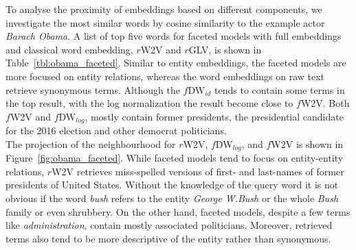 To analyse the proximity of embeddings based on different components, we investigate the most similar words by cosine similarity to the example actor \emph{Barach Obama}. A list of top five words for faceted models with full embeddings and classical word embedding, $r$W2V and $r$GLV, is shown in Table~\ref{tbl:obama_faceted}. Similar to entity embeddings, the faceted models are more focused on entity relations, whereas the word embeddings on raw text retrieve synonymous terms. Although the $f$DW$_{id}$ tends to contain some terms in the top result, with the log normalization the result become close to $f$W2V. Both $f$W2V and $f$DW$_{log }$, mostly contain former presidents, the presidential candidate for the 2016 election and other democrat politicians. \\
The projection of the neighbourhood for $r$W2V, $f$DW$_{log}$, and $f$W2V is shown in Figure~\ref{fig:obama_faceted}. While faceted models tend to focus on entity-entity relations, $r$W2V retrieves miss-spelled versions of  first- and last-names of former presidents of United States. Without the knowledge of the query word it is not obvious if the word \emph{bush} refers to the entity \emph{George W.Bush} or the whole \emph{Bush} family or even shrubbery. On the other hand, faceted models, despite a few terms like \emph{administration}, contain mostly associated politicians. Moreover, retrieved terms also tend to be more descriptive of the entity rather than synonymous.\\

